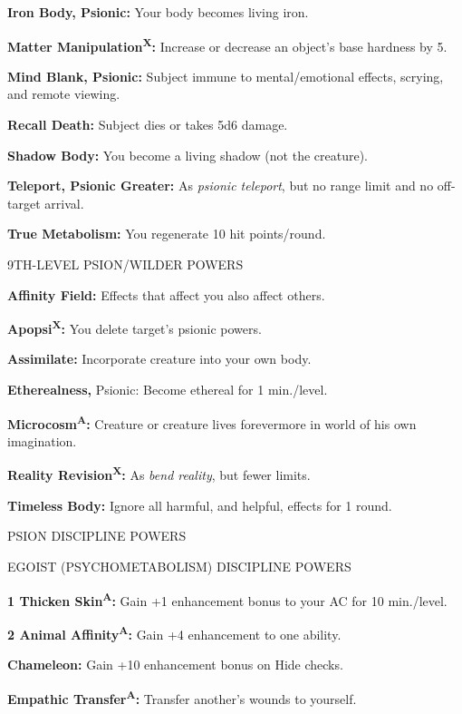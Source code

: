 \documentclass{article}
\begin{document}
\textbf{Iron Body, Psionic: }Your body becomes living iron.

\textbf{Matter Manipulation}\textsuperscript{\textbf{X}}\textbf{: }Increase or 
decrease an object's base hardness by 5.

\textbf{Mind Blank, Psionic: }Subject immune to mental/emotional effects, scrying, 
and remote viewing.

\textbf{Recall Death: }Subject dies or takes 5d6 damage.

\textbf{Shadow Body: }You become a living shadow (not the creature).

\textbf{Teleport, Psionic Greater: }As \textit{psionic teleport}, but no range 
limit and no off-target arrival.

\textbf{True Metabolism: }You regenerate 10 hit points/round.

9TH-LEVEL PSION/WILDER POWERS

\textbf{Affinity Field:} Effects that affect you also affect others.

\textbf{Apopsi}\textsuperscript{\textbf{X}}\textbf{:} You delete target's psionic 
powers.

\textbf{Assimilate:} Incorporate creature into your own body.

\textbf{Etherealness,} Psionic: Become ethereal for 1 min./level.

\textbf{Microcosm}\textsuperscript{\textbf{A}}\textbf{:} Creature or creature lives 
forevermore in world of his own imagination.

\textbf{Reality Revision}\textsuperscript{\textbf{X}}\textbf{:} As \textit{bend 
reality}, but fewer limits.

\textbf{Timeless Body:} Ignore all harmful, and helpful, effects for 1 round.

\vspace{12pt}
{\LARGE{}PSION DISCIPLINE POWERS}

EGOIST (PSYCHOMETABOLISM) DISCIPLINE POWERS

\leftskip=15pt
\parindent=-15pt
\textbf{1 Thicken Skin}\textsuperscript{\textbf{A}}\textbf{: }Gain +1 enhancement 
bonus to your AC for 10 min./level.

\textbf{2 Animal Affinity}\textsuperscript{\textbf{A}}\textbf{: }Gain +4 enhancement 
to one ability.

\parindent=0pt
\textbf{Chameleon: }Gain +10 enhancement bonus on Hide checks.

\textbf{Empathic Transfer}\textsuperscript{\textbf{A}}\textbf{: }Transfer another's 
wounds to yourself.
\end{document}

